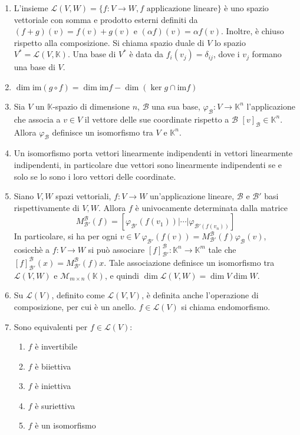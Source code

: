\documentclass[a4paper,11pt]{article}
\newcommand{\base}[1]{\mathcal{#1}}				%
\newcommand{\imm}{\mathrm{im}}						%
\begin{document}
\begin{enumerate}[resume]
	\item L'insieme $\mathcal{L}(V,W)=\{f\colon V\to W, f\textrm{ applicazione lineare}\}$ è uno spazio vettoriale con somma e prodotto esterni definiti da $(f+g)(v)=f(v)+g(v)$ e $(\alpha f)(v)=\alpha f(v)$. Inoltre, è chiuso rispetto alla composizione. Si chiama spazio duale di $V$ lo spazio $V^*=\mathcal{L}(V,\mathbb{K})$. Una base di $V^*$ è data da $f_i(v_j)=\delta_{ij}$, dove i $v_j$ formano una base di $V$.
	\item $\dim\imm(g\circ f)=\dim\imm f-\dim(\ker g\cap\imm f)$
	\item Sia $V$ un $\mathbb{K}$-spazio di dimensione $n$, $\base{B}$ una sua base, $\varphi_{\base{B}}\colon V\to\mathbb{K}^n$ l'applicazione che associa a $v\in V$ il vettore delle sue coordinate rispetto a $\base{B}$ $[v]_{\base{B}}\in\mathbb{K}^n$. Allora $\varphi_{\base{B}}$ definisce un isomorfismo tra $V$ e $\mathbb{K}^n$.
	\item Un isomorfismo porta vettori linearmente indipendenti in vettori linearmente indipendenti, in particolare due vettori sono linearmente indipendenti se e solo se lo sono i loro vettori delle coordinate.
	\item Siano $V,W$ spazi vettoriali, $f\colon V\to W$ un'applicazione lineare, $\base{B}$ e $\base{B'}$ basi rispettivamente di $V,W$. Allora $f$ è univocamente determinata dalla matrice
	\[M_{\base{B'}}^{\base{B}}(f)=[\varphi_{\base{B'}}(f(v_1))|\cdots|\varphi_{\base{B'}(f(v_n))}]\]
	In particolare, si ha per ogni $v\in V$ $\varphi_{\base{B'}}(f(v))=M_{\base{B'}}^{\base{B}}(f)\varphi_{\base{B}}(v)$, cosicchè a $f\colon V\to W$ si può associare $\left[f\right]_{\base{B'}}^{\base{B}}\colon\mathbb{K}^n\to\mathbb{K}^m$ tale che $\left[f\right]_{\base{B'}}^{\base{B}}(x)=M_{\base{B'}}^{\base{B}}(f)x$. Tale associazione definisce un isomorfismo tra $\mathcal{L}(V,W)$ e $\mathcal{M}_{m\times n}(\mathbb{K})$, e quindi $\dim\mathcal{L}(V,W)=\dim V\dim W$.
	\item Su $\mathcal{L}(V)$, definito come $\mathcal{L}(V,V)$, è definita anche l'operazione di composizione, per cui è un anello. $f\in\mathcal{L}(V)$ si chiama endomorfismo.
	\item Sono equivalenti per $f\in\mathcal{L}(V)$:
	\begin{enumerate}
		\item $f$ è invertibile
		\item $f$ è biiettiva
		\item $f$ è iniettiva
		\item $f$ è suriettiva
		\item $f$ è un isomorfismo

\end{enumerate}
\end{enumerate}
\end{document}

